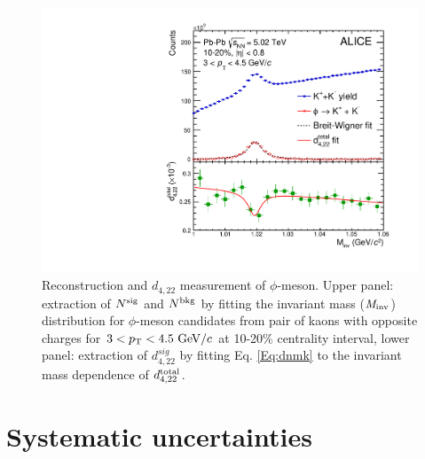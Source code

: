 \documentclass[ALICE,manyauthors]{cernphprep}
\begin{document}
\begin{figure}[!htb]
\begin{center}
\includegraphics[scale=0.45]{figures/analysisMethod/flowmass_Phi.pdf}
\end{center}
\caption{Reconstruction and $d_{4,22}$ measurement of $\phi$-meson. Upper panel: extraction of $N^{\rm{sig}}$ and $N^{\rm{bkg}}$ by fitting the invariant mass (${\it M}_{\rm{inv}}$) distribution for $\phi$-meson candidates from pair of kaons with opposite charges for $3<p_{\rm{T}}<4.5~{\rm GeV}/c$ at 10-20\% centrality interval, lower panel: extraction of $d_{4,22}^{sig}$ by fitting Eq. \ref{Eq:dnmk} to the invariant mass dependence of $d_{4,22}^{\rm total}$.}
\label{d422_phi_meson}
\end{figure}


\section{Systematic uncertainties}
\label{Sec:Systematics}
\end{document}
